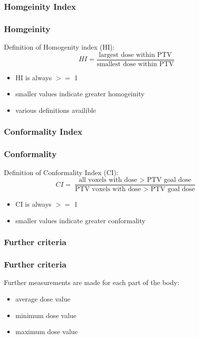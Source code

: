 \documentclass{beamer}
\begin{document}
	\subsubsection{Homgeinity Index}	
		\begin{frame}
			\frametitle{Homgeinity}
			Definition of Homogenity index (HI):
			\begin{equation}
				HI = \frac{\text{largest dose within PTV}}{\text{smallest dose within PTV}}
			\end{equation}
			\begin{itemize}
				\item HI is always $>=$ 1
				\item smaller values indicate greater homogeinity
				\item various definitions availible
			\end{itemize}   
		\end{frame}
		
	\subsubsection{Conformality Index}	
		\begin{frame}
			\frametitle{Conformality}
			Definition of Conformality Index (CI):
			\begin{equation}
				CI = \frac{\text{all voxels with dose $>$ PTV goal dose}}{\text{PTV voxels with dose $>$ PTV goal dose}}
			\end{equation}
			\begin{itemize}
				\item CI is always $>=$ 1
				\item smaller values indicate greater conformality
			\end{itemize} 
		\end{frame}
		
	\subsubsection{Further criteria}	
		\begin{frame}
			\frametitle{Further criteria}
			Further measurements are made for each part of the body:
			\begin{itemize}
				\item average dose value
				\item minimum dose value
				\item maximum dose value
			\end{itemize} 
		\end{frame}
\end{document}
